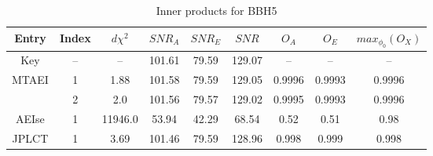 \documentclass[prd,aps,amsfonts,amsmath, nofootinbib]{revtex4}
\begin{document}
\begin{table}
\caption{\label{BBH5} Inner products for BBH5}
\begin{ruledtabular}
\begin{tabular}{|c|c|c|c|c|c|c|c|c|}
Entry & Index & $d\chi^2$ & $SNR_A$ & $SNR_E$ & $SNR$ & $O_A$ & $O_E$ & $max_{\phi_0}(O_X)$\\
\hline
Key & -- & -- & 101.61 & 79.59 & 129.07 & -- & -- & -- \\
\hline
MTAEI & 1 & 1.88 & 101.58 & 79.59 & 129.05 & 0.9996 & 0.9993 & 0.9996 \\
      & 2 & 2.0 & 101.56 & 79.57 & 129.02 & 0.9995  & 0.9993 & 0.9996 \\
\hline
AEIse & 1 & 11946.0 & 53.94 & 42.29 & 68.54 & 0.52 & 0.51 &  0.98  \\
\hline
JPLCT & 1 & 3.69 & 101.46 & 79.59 & 128.96 & 0.998 & 0.999  &  0.998\\
\hline
\end{tabular}
\end{ruledtabular}
\end{table}
\end{document}
